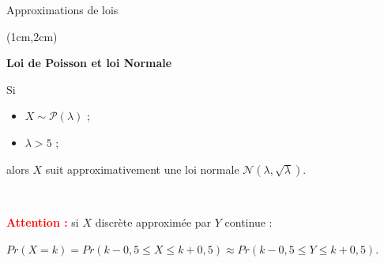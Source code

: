 \documentclass{beamer}
\begin{document}

\begin{frame}{Approximations de lois}
\begin{textblock*}{\textwidth}(1cm,2cm)

\begin{center}{\bf \Large Loi de Poisson et loi Normale } \end{center}

\begin{minipage}{0.5\textwidth}
Si 
\begin{itemize}
\item $X\sim \mathcal{P}(\lambda)$ ;
\item $\lambda >5$ ;
\end{itemize}
\end{minipage}
\begin{minipage}{0.3 \textwidth}
\begin{center}
\end{center}
\end{minipage}

alors $X$ suit approximativement une loi normale $\mathcal{N}(\lambda,\sqrt{\lambda})$.
 
 \
 
   \textcolor{red}{\bf Attention :} si $X$ discrète approximée  par $Y$ continue :

\small $
Pr(X=k)=Pr(k-0,5 \leq X \leq k+0,5) \approx Pr( k-0,5 \leq Y \leq
k+0,5).
$


\end{textblock*}

\end{frame}  


\end{document}
